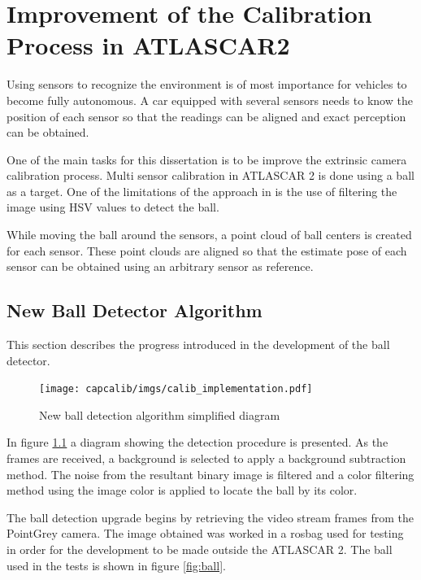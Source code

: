\chapter{Improvement of the Calibration Process in ATLASCAR2}

Using sensors to recognize the environment is of most importance for vehicles to become fully autonomous. A car equipped with several sensors needs to know the position of each sensor so that the readings can be aligned and exact perception can be obtained. 

One of the main tasks for this dissertation is to be improve the extrinsic camera calibration process. Multi sensor calibration in ATLASCAR 2 is done using a ball as a target. One of the limitations of the approach in \cite{VieiradaSilva2016} is the use of filtering the image using HSV values to detect the ball.

While moving the ball around the sensors, a point cloud of ball centers is created for each sensor. These point clouds are aligned so that the estimate pose of each sensor can be obtained using an arbitrary sensor as reference.

\section{New Ball Detector Algorithm}

This section describes the progress introduced in the development of the ball detector.

\begin{figure}[htp]
	
	\centering
	\texttt{[image: capcalib/imgs/calib\_implementation.pdf]}
	
	\caption{New ball detection algorithm simplified diagram}
	\label{fig:ball_diagram}
	
\end{figure}

In figure \ref{fig:ball_diagram} a diagram showing the detection procedure is presented. As the frames are received, a background is selected to apply a background subtraction method. The noise from the resultant binary image is filtered and a color filtering method using the image color is applied to locate the ball by its color.

The ball detection upgrade begins by retrieving the video stream frames from the PointGrey camera. The image obtained was worked in a rosbag used for testing in order for the development to be made outside the ATLASCAR 2. The ball used in the tests is shown in figure \ref{fig:ball}. 

